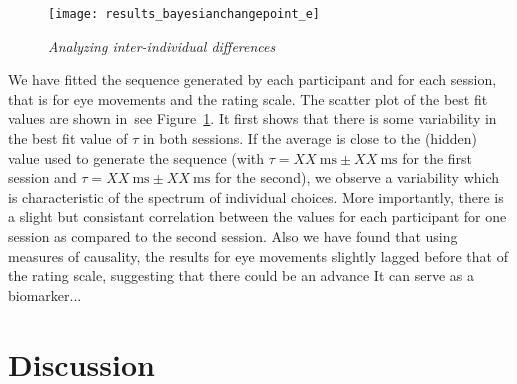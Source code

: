 \documentclass[profile,final,english, draft]{article}%
\newcommand{\ms}{\si{\milli\second}}%
\newcommand{\seeFig}[1]{see Figure~\ref{fig:#1}}
\begin{document}
\begin{figure}%
\begin{center}
    \texttt{[image: results\_bayesianchangepoint\_e]}
\end{center}
\caption{\emph{Analyzing inter-individual differences}
}
\label{fig:results_inter}
\end{figure}
We have fitted the sequence generated by each participant and
for each session, that is for eye movements and the rating scale.
The scatter plot of the best fit values are shown in~\seeFig{results_inter}.
It first shows that there is some variability in the best fit value of $\tau$
in both sessions.
If the average is close to the (hidden) value used to generate the sequence
(with $\tau = XX~\ms \pm XX~\ms$ for the first session and
 $\tau = XX~\ms \pm XX~\ms$ for the second),
 we observe a variability which is characteristic of the spectrum of individual choices.
More importantly, there is a slight but consistant
correlation between the values for each participant for one session
as compared to the second session.
Also we have found that using measures of causality,
the results for eye movements slightly lagged before
that of the rating scale,
suggesting that there could be an advance
It can serve as a biomarker...


\section{Discussion}
\end{document}
